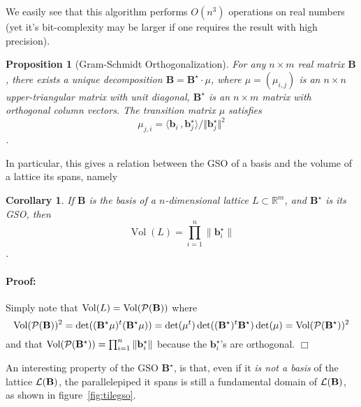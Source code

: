 \documentclass[12pt]{article}
\renewcommand{\vec}{\mathbf}
\newcommand{\R}{\mathbb R}
\newcommand{\norm}[1]{\|#1\|}
\newtheorem{proposition}[theorem]{Proposition}{\bfseries}{\upshape}
\newtheorem{corollary}[theorem]{Corollary}{\bfseries}{\upshape}
\newenvironment{proof}{\paragraph{Proof:} }{\hfill\qed\\}
\newcommand{\qed}{\hfill \ensuremath{\Box}}
\newcommand{\Vol}{\operatorname{Vol}}
\begin{document}
We easily see that this algorithm performs $O(n^3)$ operations on real numbers (yet it's bit-complexity may be larger if one requires the result with high precision).


\begin{proposition}[Gram-Schmidt Orthogonalization]
For any $n\times m$ real matrix $\vec B$, there exists a unique decomposition $\vec B =  \vec B^\star \cdot \mu$, 
where $\mu=(\mu_{i,j})$ is an $n\times n$ upper-triangular matrix with unit diagonal, $\vec B^\star$ is an $n\times m$ matrix with orthogonal column vectors.
The transition matrix $\mu$ satisfies
\[\mu_{j,i}= \langle \vec b_i\, , \vec b^\star_j \rangle / \Vert \vec b^\star_j \Vert^2 \].
\end{proposition}

In particular, this gives a relation between the GSO of a basis and the volume of a lattice its spans, namely

\begin{corollary}
If $\vec B$ is the basis of a $n$-dimensional lattice $L \subset \R^m$, and $\vec B^\star$ is its GSO,
then \[\Vol(L) = \prod_{i = 1}^n \norm{\vec b^\star_i}\].
\end{corollary}
\begin{proof}
  Simply note that $\Vol(L) = \Vol(\cP(\vec B))$ where
  \[\Vol(\cP(\vec B))^2 = \det((\vec B^\star \mu)^t (\vec B^\star \mu) ) = \det(\mu^t) \det( (\vec B^\star)^t \vec B^\star) \det(\mu) = \Vol(\cP(\vec B^\star))^2 \]
  and that $ \Vol(\cP(\vec B^\star)) = \prod_{i = 1}^n \norm{\vec b^\star_i}$ because the $\vec b^\star_i$'s are orthogonal.
\end{proof}



An interesting property of the GSO $\vec B^\star$, is that, even if it {\em is not a basis} of the 
lattice $\cL(\vec B)$, the parallelepiped it spans is still a fundamental domain of $\cL(\vec B)$, as shown in figure~\ref{fig:tilegso}.
\end{document}
